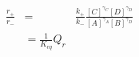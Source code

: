 \begin{eqnarray}
\frac{r_+}{r_-} & = &\frac{k_+}{k_-}\frac{[C]^{\gamma_C}[D]^{\gamma_D}}{[A]^{\gamma_A}[B]^{\gamma_D}} \\
&  =  \frac{1}{K_{eq}}Q_r \\
\end{eqnarray}